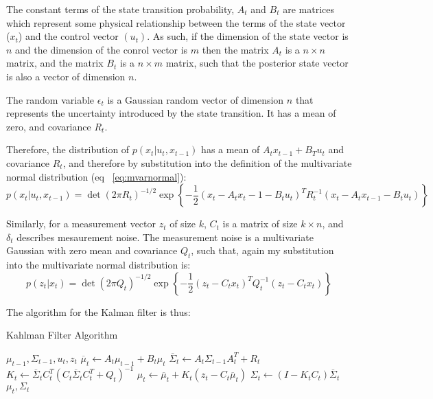 \documentclass[english]{article}
\begin{document}
The constant terms of the state transition probability, $A_t$ and $B_t$ are matrices which represent some physical relationship between the terms of the state vector ($x_t$) and the control vector $(u_t)$. As such, if the dimension of the state vector is $n$ and the dimension of the conrol vector is $m$ then the matrix $A_t$ is a $n \times n$ matrix, and the matrix $B_t$ is a $n \times m$ matrix, such that the posterior state vector is also a vector of dimension $n$. 

The random variable $\epsilon _t$ is a Gaussian random vector of dimension $n$ that represents the uncertainty introduced by the state transition. It has a mean of zero, and covariance $R_t$.

Therefore, the distribution of $p(x_t | u_t, x_{t-1})$ has a mean of $A_t x_{t-1} + B_T u_t$ and covariance $R_t$, and therefore by substitution into the definition of the multivariate normal distribution (eq ~\ref{eq:mvarnormal}):
\begin{equation}
	p(x_t | u_t, x_{t-1}) = \det(2 \pi R_t)^{-1/2} \exp\left\{-\frac{1}{2}(x_t - A_t x_t-1 - B_t u_t)^T R_t^{-1}(x_t - A_t x_{t-1} - B_t u_t)\right\}
\end{equation}

Similarly, for a measurement vector $z_t$ of size $k$, $C_t$ is a matrix of size $k \times n$, and $\delta_t$ describes mesaurement noise. The measurement noise is a multivariate Gaussian with zero mean and covariance $Q_t$, such that, again my substitution into the multivariate normal distribution is:
\begin{equation}
	p(z_t | x_t) = \det(2 \pi Q_t)^{-1/2} \exp\left\{-\frac{1}{2}(z_t - C_t x_t)^T Q_t^{-1}(z_t - C_t x_t)\right\}
\end{equation}

The algorithm for the Kalman filter is thus:

\begin{algorithm}
\caption{Kahlman Filter Algorithm}
\label{alg:kalman}
\begin{algorithmic}
	\REQUIRE $\mu_{t-1}, \Sigma_{t-1}, u_t, z_t$
	\STATE $\overline{\mu}_t \leftarrow A_t\mu_{t-1} + B_t \mu_t$
	\STATE $\overline{\Sigma}_t \leftarrow A_t \Sigma_{t-1}A_t^T + R_t$
	\STATE
	\STATE $K_t \leftarrow \overline{\Sigma}_t C_t^T\left(C_t \overline{\Sigma}_t C_t^T + Q_t\right)^{-1}$
	\STATE $\mu_t \leftarrow \overline{\mu}_t + K_t\left(z_t - C_t \overline{\mu}_t\right)$
	\STATE $\Sigma_t \leftarrow (I-K_t C_t)\overline{\Sigma}_t$
	\RETURN $\mu_t, \Sigma_t$
\end{algorithmic}
\end{algorithm}
\end{document}
